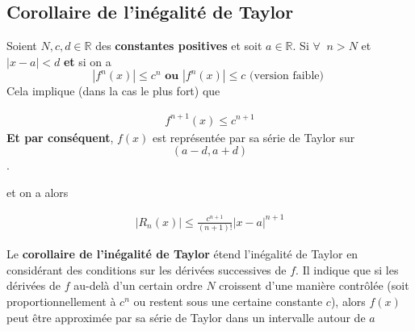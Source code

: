\documentclass{report}
\begin{document}
\begin{multicols*}{3}
  \section{Corollaire de l'inégalité de Taylor}
  Soient $N, c, d \in \mathbb{R}$ des 
  \textbf{constantes positives}   
  et soit $a \in \mathbb{R}$. Si 
  $\forall \;\; n > N$ et $|x - a | < d$ 
  \textbf{et}  si on a  
  \[ |f^{n}(x)| \leq c^n \textbf{  ou } 
  |f^{n}(x)| \leq c \text{ (version faible) } \]
  Cela implique (dans la cas le plus fort) que 

  \begin{align*}
      f^{n+1}(x) \leq c^{n+1}
  \end{align*}
  \textbf{Et par conséquent}, $f(x)$ est 
  représentée par sa série de 
  Taylor sur $$(a - d, a + d)$$. 

  et on a alors 

  \begin{align*}
    |R_n(x)| \leq \frac{c^{n+1}}{(n+1)!} 
          \left|x - a \right|^{n+1}
  \end{align*}

  Le \textbf{ corollaire de l'inégalité de Taylor}
  étend l'inégalité de Taylor en considérant 
  des conditions sur les dérivées successives de 
  $f$. Il indique que si les dérivées de 
  $f$ au-delà d'un certain ordre $N$ croissent 
  d'une manière contrôlée 
  (soit proportionnellement à $c^n$
  ou restent sous une certaine constante 
  $c$), alors $f(x)$ peut être approximée par 
  sa série de Taylor dans un intervalle autour de 
  $a$




  











     











 \end{multicols*}
\end{document}
